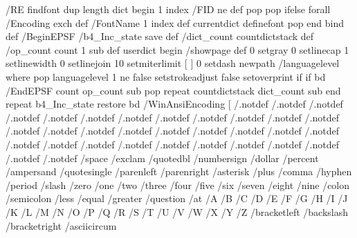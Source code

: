 /RE { %
  findfont dup length dict begin
  {
    1 index /FID ne
    {def} {pop pop} ifelse
  } forall
  /Encoding exch def
  /FontName 1 index def
  currentdict definefont pop
  end
} bind def
/BeginEPSF { %
/b4_Inc_state save def         %
/dict_count countdictstack def %
/op_count count 1 sub def      %
userdict begin                 %
/showpage { } def              %
0 setgray 0 setlinecap         %
1 setlinewidth 0 setlinejoin
10 setmiterlimit [ ] 0 setdash newpath
/languagelevel where           %
{pop languagelevel             %
1 ne                           %
{false setstrokeadjust false setoverprint
} if
} if
} bd
/EndEPSF { %
count op_count sub {pop} repeat            %
countdictstack dict_count sub {end} repeat
b4_Inc_state restore
} bd
/WinAnsiEncoding [
/.notdef /.notdef /.notdef /.notdef /.notdef
/.notdef /.notdef /.notdef /.notdef /.notdef
/.notdef /.notdef /.notdef /.notdef /.notdef
/.notdef /.notdef /.notdef /.notdef /.notdef
/.notdef /.notdef /.notdef /.notdef /.notdef
/.notdef /.notdef /.notdef /.notdef /.notdef
/.notdef /.notdef /space /exclam /quotedbl
/numbersign /dollar /percent /ampersand /quotesingle
/parenleft /parenright /asterisk /plus /comma
/hyphen /period /slash /zero /one
/two /three /four /five /six
/seven /eight /nine /colon /semicolon
/less /equal /greater /question /at
/A /B /C /D /E
/F /G /H /I /J
/K /L /M /N /O
/P /Q /R /S /T
/U /V /W /X /Y
/Z /bracketleft /backslash /bracketright /asciicircum
